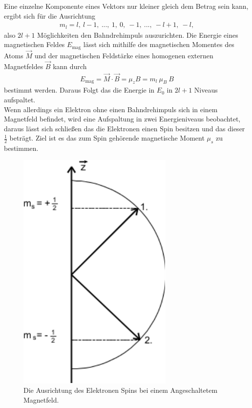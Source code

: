 Eine einzelne Komponente eines Vektors nur kleiner gleich dem Betrag sein kann, ergibt sich für die Ausrichtung
\begin{align}
	m_l = l,\ l-1,\ ...,\ 1,\ 0,\ -1,\ ... ,\ -l+1,\ -l,
\end{align}
also $2l+1 $ Möglichkeiten den Bahndrehimpuls auszurichten. Die Energie eines magnetischen Feldes $E_\text{mag}$ lässt sich mithilfe des magnetischen Momentes des Atoms $\vec{M}$ und der magnetischen Feldstärke eines homogenen externen Magnetfeldes $\vec{B}$ kann durch 
\begin{align}
	E_\text{mag}=\vec{M}\cdot\vec{B}=\mu_zB=m_l\ \mu_B\ B
\end{align}
bestimmt werden. Daraus Folgt das die Energie in $E_0$ in $2l+1$ Niveaus aufspaltet.\\
Wenn allerdings ein Elektron ohne einen Bahndrehimpuls sich in einem Magnetfeld befindet, wird eine Aufspaltung in zwei Energieniveaus beobachtet, daraus lässt sich schließen das die Elektronen einen Spin besitzen und das dieser $\frac{1}{2}$ beträgt. Ziel ist es das zum Spin gehörende magnetische Moment $\mu_s$ zu bestimmen.
\begin{figure}[h!]
\centering
\includegraphics[width=\textwidth/4]{../Grafiken/SpinElektron.pdf}
\caption{Die Ausrichtung des Elektronen Spins bei einem Angeschaltetem Magnetfeld.\cite{V28}}\label{fig:Resonanz}
\end{figure}
